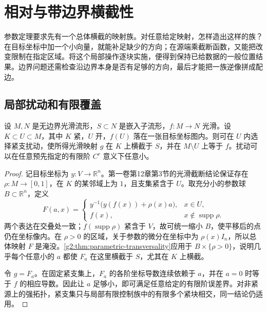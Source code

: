 
% 
% 
% 

\section{相对与带边界横截性}
\label{g2:sec:1404}

参数定理要求先有一个总体横截的映射族。对任意给定映射，怎样造出这样的族？在目标坐标中加一个小向量，就能补足缺少的方向；在源端乘截断函数，又能把改变限制在指定区域。将这个局部操作逐块实施，便得到保持已给数据的一般位置结果。边界问题还需检查沿边界本身是否有足够的方向，最后才能把一族逆像拼成配边。

\subsection{局部扰动和有限覆盖}
\label{g2:subsec:1404:01}

\begin{lemma}\label{g2:lem:local-transverse-perturbation}
	设 \(M,N\) 是无边界光滑流形，\(S\subset N\) 是嵌入子流形，\(f:M\to N\) 光滑。设 \(K\subset U\subset M\)，其中 \(K\) 紧，\(U\) 开，\(f(U)\) 落在一张目标坐标图内。则可在 \(U\) 内选择紧支扰动，使所得光滑映射 \(g\) 在 \(K\) 上横截于 \(S\)，并在 \(M\setminus U\) 上等于 \(f\)。扰动可以在任意预先指定的有限阶 \(C^r\) 意义下任意小。
\end{lemma}
\begin{proof}
	记目标坐标为 \(y:V\to\mathbb R^n\)。第一卷第12章第3节的光滑截断结论保证存在 \(\rho:M\to[0,1]\)，在 \(K\) 的某邻域上为 \(1\)，且支集紧含于 \(U\)。取充分小的参数球 \(B\subset\mathbb R^n\)，定义
	\[
		F(a,x)=\begin{cases}
			y^{-1}\bigl(y(f(x))+\rho(x)a\bigr),&x\in U,\\
			f(x),&x\notin\operatorname{supp}\rho.
		\end{cases}
	\]
	两个表达在交叠处一致；\(f(\operatorname{supp}\rho)\) 紧含于 \(V\)，故可统一缩小 \(B\)，使平移后的点仍在坐标像内。在 \(\rho>0\) 的区域，关于参数的微分在坐标中为 \(\rho(x)I_n\)，所以总体映射 \(F\) 是淹没。\cref{g2:thm:parametric-transversality}应用于 \(B\times\{\rho>0\}\)，说明几乎每个任意小的 \(a\) 都使 \(F_a\) 在这里横截于 \(S\)，尤其在 \(K\) 上横截。

	令 \(g=F_a\)。在固定紧支集上，\(F_a\) 的各阶坐标导数连续依赖于 \(a\)，并在 \(a=0\) 时等于 \(f\) 的相应导数。因此让 \(a\) 足够小，即可满足任意给定的有限阶误差界。对非紧源上的强拓扑，紧支集只与局部有限控制族中的有限多个紧块相交，同一结论仍适用。
\end{proof}


